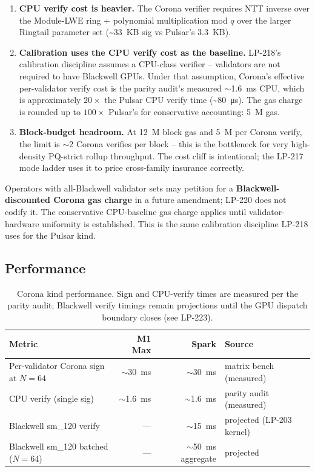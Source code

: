 \begin{enumerate}[leftmargin=2em,nosep]
\item \textbf{CPU verify cost is heavier.} The Corona verifier
  requires NTT inverse over the Module-LWE ring + polynomial
  multiplication mod $q$ over the larger Ringtail parameter set
  (\textasciitilde\SI{33}{KB} sig vs Pulsar's \SI{3.3}{KB}).
\item \textbf{Calibration uses the CPU verify cost as the
  baseline.} LP-218's calibration discipline assumes a
  CPU-class verifier -- validators are not required to have
  Blackwell GPUs. Under that assumption, Corona's effective
  per-validator verify cost is the parity audit's measured
  $\sim$\SI{1.6}{\milli\second} CPU, which is approximately
  $20\times$ the Pulsar CPU verify time
  (\textasciitilde\SI{80}{\micro\second}). The gas charge
  is rounded up to $100\times$ Pulsar's for conservative
  accounting:
  \SI{5}{M} gas.
\item \textbf{Block-budget headroom.} At \SI{12}{M} block gas
  and \SI{5}{M} per Corona verify, the limit is $\sim$2 Corona
  verifies per block -- this is the bottleneck for very high-
  density PQ-strict rollup throughput. The cost cliff is
  intentional; the LP-217 mode ladder uses it to price
  cross-family insurance correctly.
\end{enumerate}

Operators with all-Blackwell validator sets may petition for a
\textbf{Blackwell-discounted Corona gas charge} in a future
amendment; LP-220 does not codify it. The conservative
CPU-baseline gas charge applies until validator-hardware
uniformity is established. This is the same calibration
discipline LP-218 uses for the Pulsar kind.

\subsection{Performance}

\begin{table}[h]
\centering
\small
\begin{tabular}{@{}lrrl@{}}
\toprule
\textbf{Metric} & \textbf{M1 Max} & \textbf{Spark} & \textbf{Source} \\
\midrule
Per-validator Corona sign at $N{=}64$ & $\sim$\SI{30}{\milli\second} & $\sim$\SI{30}{\milli\second} & matrix bench (measured)~\cite{parityaudit} \\
CPU verify (single sig) & $\sim$\SI{1.6}{\milli\second} & $\sim$\SI{1.6}{\milli\second} & parity audit (measured) \\
Blackwell sm\_120 verify & --- & $\sim$\SI{15}{\milli\second} & projected (LP-203 kernel)~\cite{lp203} \\
Blackwell sm\_120 batched ($N{=}64$) & --- & $\sim$\SI{50}{\milli\second} aggregate & projected \\
\bottomrule
\end{tabular}
\caption{Corona kind performance. Sign and CPU-verify times are
measured per the parity audit; Blackwell verify timings remain
projections until the GPU dispatch boundary closes (see
LP-223).}
\label{tab:corona-perf}
\end{table}

